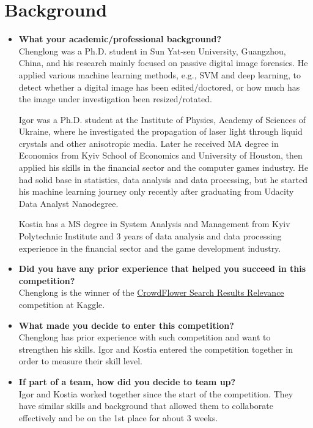 \documentclass[12pt]{article}
\begin{document}
\newpage
\tableofcontents

\newpage


\section{Background}
\begin{itemize}
\item \textbf{What your academic/professional background?}\\
	Chenglong was a Ph.D. student in Sun Yat-sen University, Guangzhou, China, and his research mainly focused on passive digital image forensics. He applied various machine learning methods, e.g., SVM and deep learning, to detect whether a digital image has been edited/doctored, or how much has the image under investigation been resized/rotated.

	Igor was a Ph.D. student at the Institute of Physics, Academy of Sciences of Ukraine, where he investigated the propagation of laser light through liquid crystals and other anisotropic media. Later he received MA degree in Economics from Kyiv School of Economics and University of Houston, then applied his skills in the financial sector and the computer games industry. He had solid base in statistics, data analysis and data processing, but he started his machine learning journey only recently after graduating from Udacity Data Analyst Nanodegree.

	Kostia has a MS degree in System Analysis and Management from Kyiv Polytechnic Institute and 3 years of data analysis and data processing experience in the financial sector and the game development industry.

\item \textbf{Did you have any prior experience that helped you succeed in this competition?}\\
	Chenglong is the winner of the \href{https://www.kaggle.com/c/crowdflower-search-relevance}{CrowdFlower Search Results Relevance} competition at Kaggle.

\item \textbf{What made you decide to enter this competition?} \\
	Chenglong has prior experience with such competition and want to strengthen his skills. Igor and Kostia entered the competition together in order to measure their skill level.

\item \textbf{If part of a team, how did you decide to team up?} \\
	Igor and Kostia worked together since the start of the competition. They have similar skills and background that allowed them to collaborate effectively and be on the 1st place for about 3 weeks.


\end{itemize}
\end{document}
